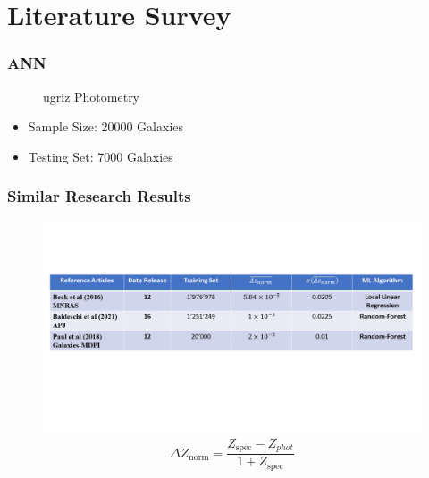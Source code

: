 \documentclass{beamer}
\begin{document}
\section{Literature Survey}
\begin{frame}
        \frametitle{ANN}
        \begin{figure}
            \caption*{ugriz Photometry}
        \end{figure}
        \begin{itemize}
            \item Sample Size: 20000 Galaxies
            \item Testing Set: 7000 Galaxies
        \end{itemize}
        \end{frame}

\begin{frame}
        \frametitle{Similar Research Results}
        \begin{figure}
\vspace*{-18mm}
            \includegraphics[scale=0.37]{img/Litsurvey.png}
\vspace*{-25mm}
\begin{equation}
\Delta Z_{\text {norm}}=\frac{Z_{\text {spec}}-Z_{phot}}{1+Z_{\text {spec}}}
\end{equation}
        \end{figure}

        \end{frame}
\end{document}
